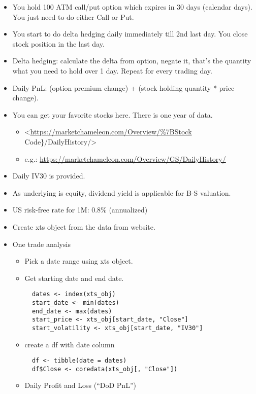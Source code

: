 \documentclass[]{article}
\providecommand{\tightlist}{%
  \setlength{\itemsep}{0pt}\setlength{\parskip}{0pt}}
\begin{document}
\begin{itemize}
\item
  You hold 100 ATM call/put option which expires in 30 days (calendar
  days). You just need to do either Call or Put.
\item
  You start to do delta hedging daily immediately till 2nd last day. You
  close stock position in the last day.
\item
  Delta hedging: calculate the delta from option, negate it, that's the
  quantity what you need to hold over 1 day. Repeat for every trading
  day.
\item
  Daily PnL: (option premium change) + (stock holding quantity * price
  change).
\item
  You can get your favorite stocks here. There is one year of data.

  \begin{itemize}
  \tightlist
  \item
    \textless{}\url{https://marketchameleon.com/Overview/\%7BStock}
    Code\}/DailyHistory/\textgreater{}
  \item
    e.g.: \url{https://marketchameleon.com/Overview/GS/DailyHistory/}
  \end{itemize}
\item
  Daily IV30 is provided.
\item
  As underlying is equity, dividend yield is applicable for B-S
  valuation.
\item
  US risk-free rate for 1M: 0.8\% (annualized)
\item
  Create xts object from the data from website.
\item
  One trade analysis

  \begin{itemize}
  \item
    Pick a date range using xts object.
  \item
    Get starting date and end date.

\begin{verbatim}
  dates <- index(xts_obj)
  start_date <- min(dates)
  end_date <- max(dates)
  start_price <- xts_obj[start_date, "Close"]
  start_volatility <- xts_obj[start_date, "IV30"]
\end{verbatim}
  \item
    create a df with date column

\begin{verbatim}
  df <- tibble(date = dates)
  df$Close <- coredata(xts_obj[, "Close"])
\end{verbatim}
  \item
    Daily Profit and Loss (``DoD PnL'')


\end{itemize}
\end{itemize}
\end{document}
